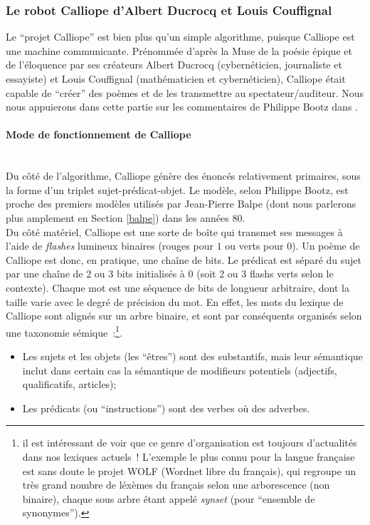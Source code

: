\documentclass{article}
\newcommand{\subsubsubsection}[1]{\paragraph{#1}\mbox{}\\}
\begin{document}
			\subsubsection{Le robot Calliope d'Albert Ducrocq et Louis Couffignal}\label{calliope}
				Le ``projet Calliope'' est bien plus qu'un simple algorithme, puisque Calliope est une machine communicante. Prénommée d'après la Muse de la poésie épique et de l'éloquence par ses créateurs Albert Ducrocq (cybernéticien, journaliste et essayiste) et Louis Couffignal (mathématicien et cybernéticien), Calliope était capable de ``créer'' des poèmes et de les transmettre au spectateur/auditeur. Nous nous appuierons dans cette partie sur les commentaires de Philippe Bootz dans \cite{bootz}.\\
				\subsubsubsection{Mode de fonctionnement de Calliope}
					Du côté de l'algorithme, Calliope génère des énoncés relativement primaires, sous la forme d'un triplet sujet-prédicat-objet. Le modèle, selon Philippe Bootz, est proche des premiers modèles utilisés par Jean-Pierre Balpe (dont nous parlerons plus amplement en Section \ref{balpe}) dans les années 80.\\
					Du côté matériel, Calliope est une sorte de boîte qui transmet ses messages à l'aide de \textit{flashes} lumineux binaires (rouges pour $1$ ou verts pour $0$). Un poème de Calliope est donc, en pratique, une chaîne de bits. Le prédicat est séparé du sujet par une chaîne de 2 ou 3 bits initialisés à 0 (soit 2 ou 3 flashs verts selon le contexte). Chaque mot est une séquence de bits de longueur arbitraire, dont la taille varie avec le degré de précision du mot. En effet, les mots du lexique de Calliope sont alignés sur un arbre binaire, et sont par conséquents organisés selon une taxonomie sémique~:\footnote{il est intéressant de voir que ce genre d'organisation est toujours d'actualités dans nos lexiques actuels ! L'exemple le plus connu pour la langue française est sans doute le projet WOLF (Wordnet libre du français), qui regroupe un très grand nombre de léxèmes du français selon une arborescence (non binaire), chaque sous arbre étant appelé \textit{synset} (pour ``ensemble de synonymes'').}.
					\vspace{2mm}
					\begin{itemize}
						\item Les sujets et les objets (les ``êtres'') sont des substantifs, mais leur sémantique inclut dans certain cas la sémantique de modifieurs potentiels (adjectifs, qualificatifs, articles);
						\item Les prédicats (ou ``instructions'') sont des verbes où des adverbes.
					\end{itemize} 
\end{document}

